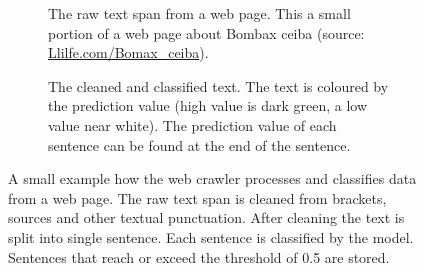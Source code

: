 \documentclass[a4paper, 12pt, oneside]{book} %
\begin{document}
\begin{figure} [htbp]
     \centering
     \begin{subfigure}[b]{1.00\textwidth}
         \centering
         \caption[Raw text span example]{The raw text span from a web page. This a small portion of a web page about Bombax ceiba (source: \href{http://www.llifle.com/Encyclopedia/TREES/Family/Bombacaceae/31994/Bombax_ceiba}{Llilfe.com/Bomax\_ceiba}).}
         \label{fig:webcrawler_sents_nopred}
     \end{subfigure}
     \vfill
     \begin{subfigure}[b]{1.00\textwidth}
         \centering
         \caption[Cleaned and classified text span example]{The cleaned and classified text. The text is coloured by the prediction value (high value is dark green, a low value near white). The prediction value of each sentence can be found at the end of the sentence.}
         \label{fig:webcrawler_sents_pred}
     \end{subfigure}
     \caption[Example of the web crawler process]{A small example how the web crawler processes and classifies data from a web page. The raw text span is cleaned from brackets, sources and other textual punctuation. After cleaning the text is split into single sentence. Each sentence is classified by the model. Sentences that reach or exceed the threshold of 0.5 are stored.}
\end{figure}
\end{document}
